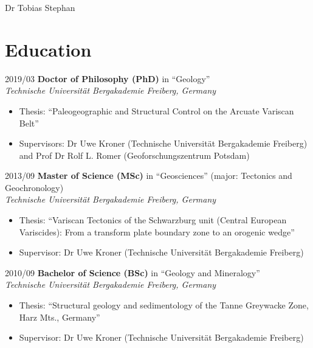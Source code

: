 \documentclass[10pt, paper=letter]{scrartcl} %
\begin{document}
\begin{cv}{\textsf{Dr Tobias Stephan}}
    \section{Education}
    \begin{cvlist}{}
        \item[2019/03] \textbf{Doctor of Philosophy (PhD)} in \enquote{Geology}\\ \textit{Technische Universit\"at Bergakademie Freiberg, Germany}
        \begin{itemize}\setlength\itemsep{-0.5em}
            \item Thesis: \enquote{Paleogeographic and Structural Control on the Arcuate Variscan
                      Belt}
            \item Supervisors: Dr Uwe Kroner (Technische Universit\"at Bergakademie Freiberg) and
                  Prof Dr Rolf L. Romer (Geoforschungszentrum Potsdam)
        \end{itemize}
        \item[2013/09] \textbf{Master of Science (MSc)} in \enquote{Geosciences} (major: Tectonics and Geochronology)\\
        \textit{Technische Universit\"at Bergakademie Freiberg, Germany}
        \begin{itemize}\setlength\itemsep{-0.5em}
            \item Thesis: \enquote{Variscan Tectonics of the Schwarzburg unit (Central European
                      Variscides): From a transform plate boundary zone to an orogenic wedge}
            \item Supervisor: Dr Uwe Kroner (Technische Universit\"at Bergakademie Freiberg)
        \end{itemize}
        \item[2010/09] \textbf{Bachelor of Science (BSc)} in \enquote{Geology and Mineralogy}\\
        \textit{Technische Universit\"at Bergakademie Freiberg, Germany}
        \begin{itemize}\setlength\itemsep{-0.5em}
            \item Thesis: \enquote{Structural geology and sedimentology of the Tanne Greywacke
                      Zone, Harz Mts., Germany}
            \item Supervisor: Dr Uwe Kroner (Technische Universit\"at Bergakademie Freiberg)
        \end{itemize}
    \end{cvlist}


\end{cv}
\end{document}
